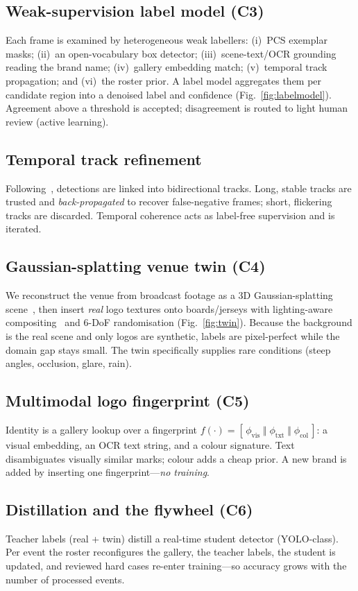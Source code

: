 \documentclass[conference]{IEEEtran}
\begin{document}
\subsection{Weak-supervision label model (C3)}
Each frame is examined by heterogeneous weak labellers: (i)~PCS exemplar masks;
(ii)~an open-vocabulary box detector; (iii)~scene-text/OCR grounding reading the
brand name; (iv)~gallery embedding match; (v)~temporal track propagation; and
(vi)~the roster prior. A label model aggregates them per candidate region into a
denoised label and confidence (Fig.~\ref{fig:labelmodel}). Agreement above a
threshold is accepted; disagreement is routed to light human review
(active learning).

\subsection{Temporal track refinement}
Following~\cite{trackrefine}, detections are linked into bidirectional tracks.
Long, stable tracks are trusted and \emph{back-propagated} to recover
false-negative frames; short, flickering tracks are discarded. Temporal coherence
acts as label-free supervision and is iterated.

\subsection{Gaussian-splatting venue twin (C4)}
We reconstruct the venue from broadcast footage as a 3D Gaussian-splatting
scene~\cite{gsdata}, then insert \emph{real} logo textures onto boards/jerseys
with lighting-aware compositing~\cite{d3dr} and 6-DoF randomisation
(Fig.~\ref{fig:twin}). Because the background is the real scene and only logos are
synthetic, labels are pixel-perfect while the domain gap stays small. The twin
specifically supplies rare conditions (steep angles, occlusion, glare, rain).

\subsection{Multimodal logo fingerprint (C5)}
Identity is a gallery lookup over a fingerprint
$f(\cdot)=[\,\phi_{\text{vis}}\;\Vert\;\phi_{\text{txt}}\;\Vert\;\phi_{\text{col}}\,]$:
a visual embedding, an OCR text string, and a colour signature. Text disambiguates
visually similar marks; colour adds a cheap prior. A new brand is added by
inserting one fingerprint---\emph{no training}.

\subsection{Distillation and the flywheel (C6)}
Teacher labels (real + twin) distill a real-time student detector (YOLO-class).
Per event the roster reconfigures the gallery, the teacher labels, the student is
updated, and reviewed hard cases re-enter training---so accuracy grows with the
number of processed events.
\end{document}
